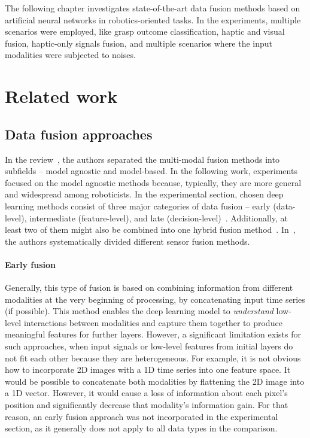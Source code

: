 \documentclass[a4paper, 10pt, twoside]{report}
\begin{document}
The following chapter investigates state-of-the-art data fusion methods based on artificial neural networks in robotics-oriented tasks. In the experiments, multiple scenarios were employed, like grasp outcome classification, haptic and visual fusion, haptic-only signals fusion, and multiple scenarios where the input modalities were subjected to noises.

\section{Related work}
\label{part:methods:fusion:rw}

\subsection{Data fusion approaches}
\label{part:methods:fusion:rw:approaches}

In the review~\cite{survey_morrency}, the authors separated the multi-modal fusion methods into subfields -- model agnostic and model-based. In the following work, experiments focused on the model agnostic methods because, typically, they are more general and widespread among roboticists. In the experimental section, chosen deep learning methods consist of three major categories of data fusion -- early (data-level), intermediate (feature-level), and late (decision-level)~\cite{survey_taylor}. Additionally, at least two of them might also be combined into one hybrid fusion method~\cite{survey_morrency}. In~\cite{Castanedo2013ARO}, the authors systematically divided different sensor fusion methods.

\paragraph{Early fusion} Generally, this type of fusion is based on combining information from different modalities at the very beginning of processing, \eg by concatenating input time series (if possible). This method enables the deep learning model to \textit{understand} low-level interactions between modalities and capture them together to produce meaningful features for further layers. However, a significant limitation exists for such approaches, \ie when input signals or low-level features from initial layers do not fit each other because they are heterogeneous. For example, it is not obvious how to incorporate 2D images with a 1D time series into one feature space. It would be possible to concatenate both modalities by flattening the 2D image into a 1D vector. However, it would cause a loss of information about each pixel's position and significantly decrease that modality's information gain. For that reason, an early fusion approach was not incorporated in the experimental section, as it generally does not apply to all data types in the comparison. 
\end{document}
